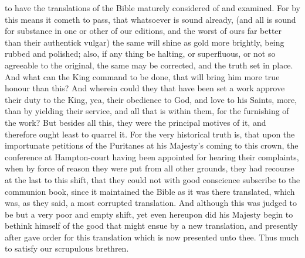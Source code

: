 to have the translations of the Bible maturely considered of and examined. For by this means it cometh to pass, that whatsoever is sound already, (and all is sound for substance in one or other of our editions, and the worst of ours far better than their authentick vulgar) the same will shine as gold more brightly, being rubbed and polished; also, if any thing be halting, or superfluous, or not so agreeable to the original, the same may be corrected, and the truth set in place. And what can the King command to be done, that will bring him more true honour than this? And wherein could they that have been set a work approve their duty to the King, yea, their obedience to God, and love to his Saints, more, than by yielding their service, and all that is within them, for the furnishing of the work? But besides all this, they were the principal motives of it, and therefore ought least to quarrel it. For the very historical truth is, that upon the importunate petitions of the Puritanes at his Majesty's coming to this crown, the conference at Hampton-court having been appointed for hearing their complaints, when by force of reason they were put from all other grounds, they had recourse at the last to this shift, that they could not with good conscience subscribe to the communion book, since it maintained the Bible as it was there translated, which was, as they said, a most corrupted translation. And although this was judged to be but a very poor and empty shift, yet even hereupon did his Majesty begin to bethink himself of the good that might ensue by a new translation, and presently after gave order for this translation which is now presented unto thee. Thus much to satisfy our scrupulous brethren.

